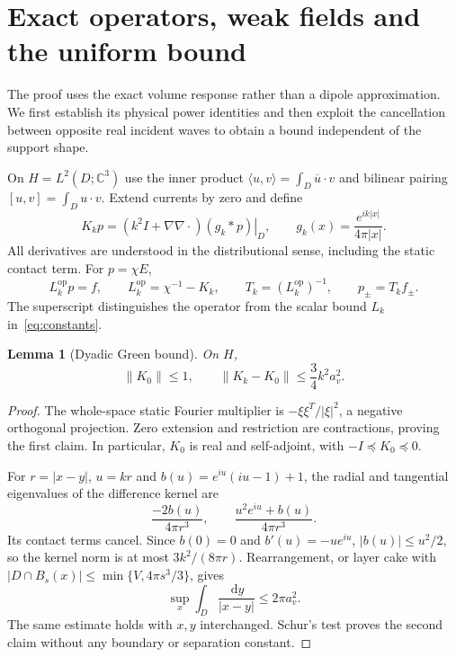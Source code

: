 \documentclass[11pt]{article}
\newtheorem{lemma}[theorem]{Lemma}
\newcommand{\dd}{\,\mathrm{d}}
\newcommand{\ip}[2]{\langle #1,#2\rangle}
\newcommand{\bilin}[2]{[#1,#2]}
\newcommand{\norm}[1]{\lVert #1\rVert}
\newcommand{\abs}[1]{\lvert #1\rvert}
\begin{document}
\section{Exact operators, weak fields and the uniform bound}\label{sec:operators}
The proof uses the exact volume response rather than a dipole approximation. We first establish its physical power identities and then exploit the cancellation between opposite real incident waves to obtain a bound independent of the support shape.

On $H=L^2(D;\mathbb C^3)$ use the inner product $\ip{u}{v}=\int_D\overline u\cdot v$ and bilinear pairing $\bilin{u}{v}=\int_Du\cdot v$. Extend currents by zero and define
\begin{equation}\label{eq:K}
 K_kp=\left.(k^2I+\nabla\nabla\cdot)(g_k*p)\right|_D,
 \qquad g_k(x)=\frac{e^{ik\abs{x}}}{4\pi\abs{x}}.
\end{equation}
All derivatives are understood in the distributional sense, including the static contact term. For $p=\chi E$,
\begin{equation}\label{eq:response}
 L_k^{\mathrm{op}}p=f,\qquad L_k^{\mathrm{op}}=\chi^{-1}-K_k,
 \qquad T_k=(L_k^{\mathrm{op}})^{-1},\qquad p_\pm=T_kf_\pm.
\end{equation}
The superscript distinguishes the operator from the scalar bound $L_k$ in~\eqref{eq:constants}.

\begin{lemma}[Dyadic Green bound]\label{lem:green}
On $H$,
\begin{equation}\label{eq:green-bound}
 \norm{K_0}\leq1,\qquad \norm{K_k-K_0}\leq\frac34k^2a_v^2.
\end{equation}
\end{lemma}
\begin{proof}
The whole-space static Fourier multiplier is $-\xi\xi^T/\abs{\xi}^2$, a negative orthogonal projection. Zero extension and restriction are contractions, proving the first claim. In particular, $K_0$ is real and self-adjoint, with $-I\preceq K_0\preceq0$.

For $r=\abs{x-y}$, $u=kr$ and $b(u)=e^{iu}(iu-1)+1$, the radial and tangential eigenvalues of the difference kernel are
\begin{equation}\label{eq:kernel-eigenvalues}
 \frac{-2b(u)}{4\pi r^3},\qquad
 \frac{u^2e^{iu}+b(u)}{4\pi r^3}.
\end{equation}
Its contact terms cancel. Since $b(0)=0$ and $b'(u)=-ue^{iu}$, $\abs{b(u)}\leq u^2/2$, so the kernel norm is at most $3k^2/(8\pi r)$. Rearrangement, or layer cake with $\abs{D\cap B_s(x)}\leq\min\{V,4\pi s^3/3\}$, gives
\[
 \sup_x\int_D\frac{\dd y}{\abs{x-y}}\leq2\pi a_v^2.
\]
The same estimate holds with $x,y$ interchanged. Schur's test proves the second claim without any boundary or separation constant.
\end{proof}
\end{document}
